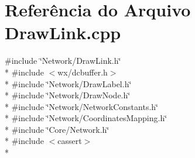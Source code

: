 \section{Referência do Arquivo Draw\+Link.\+cpp}
\label{_draw_link_8cpp}
{\ttfamily \#include \char`\"{}Network/\+Draw\+Link.\+h\char`\"{}}\\*
{\ttfamily \#include $<$wx/dcbuffer.\+h$>$}\\*
{\ttfamily \#include \char`\"{}Network/\+Draw\+Label.\+h\char`\"{}}\\*
{\ttfamily \#include \char`\"{}Network/\+Draw\+Node.\+h\char`\"{}}\\*
{\ttfamily \#include \char`\"{}Network/\+Network\+Constants.\+h\char`\"{}}\\*
{\ttfamily \#include \char`\"{}Network/\+Coordinates\+Mapping.\+h\char`\"{}}\\*
{\ttfamily \#include \char`\"{}Core/\+Network.\+h\char`\"{}}\\*
{\ttfamily \#include $<$cassert$>$}\\*
